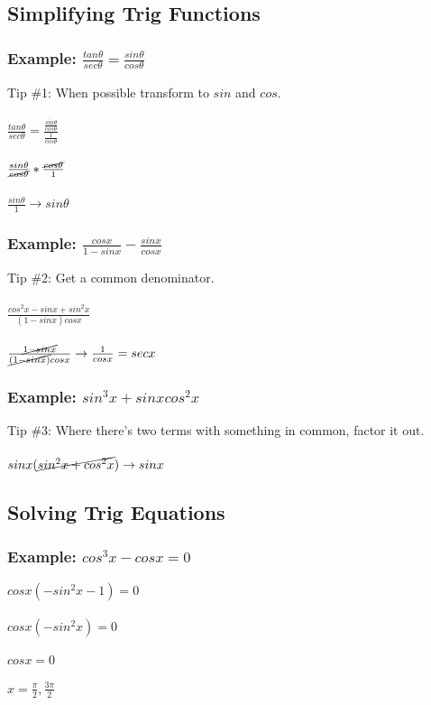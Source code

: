 \documentclass[12pt, english]{article}
\begin{document}
	\subsection{Simplifying Trig Functions}
	\subsubsection*{Example: $\frac{tan\theta}{sec\theta} = \frac{sin\theta}{cos\theta}$}
	Tip \#1: When possible transform to $sin$ and $cos$. \\
	\\
	$\frac{tan\theta}{sec\theta} = \frac{\frac{sin\theta}{cos\theta}}{\frac{1}{cos\theta}}$ \\
	\\
	$\frac{sin\theta}{\cancel{cos\theta}} * \frac{\cancel{cos\theta}}{1}$ \\
	\\
	$\frac{sin\theta}{1} \to sin\theta$
	\subsubsection*{Example: $\frac{cosx}{1-sinx} - \frac{sinx}{cosx}$}
	Tip \#2: Get a common denominator. \\
	\\
	$\frac{cos^2x-sinx+sin^2x}{(1-sinx)cosx}$ \\
	\\
	$\frac{\cancel{1-sinx}}{\cancel{(1-sinx)}cosx} \to \frac{1}{cosx} = secx$
	\subsubsection*{Example: $sin^3x+sinxcos^2x$}
	Tip \#3: Where there's two terms with something in common, factor it out.\\
	\\
	$sinx(\cancel{sin^2x+cos^2x}) \to sinx$
	\subsection{Solving Trig Equations}
	\subsubsection*{Example: $cos^3x-cosx = 0$}
	$cosx(-sin^2x-1) = 0$ \\
	\\
	$cosx(-sin^2x) = 0$ \\
	\\
	$cosx = 0$ \\
	\\
	$x = \frac{\pi}{2}, \frac{3\pi}{2}$
\end{document}
